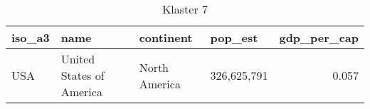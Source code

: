 \begin{table}
    \centering
    \caption{Klaster 7}
    \label{tab:cl7}
    \begin{tabular}{llllr}
        \toprule
        iso\_a3 & name                     & continent     & pop\_est    & gdp\_per\_cap \\
        \midrule
        USA     & United States of America & North America & 326,625,791 & 0.057         \\
        \bottomrule
    \end{tabular}
\end{table}
